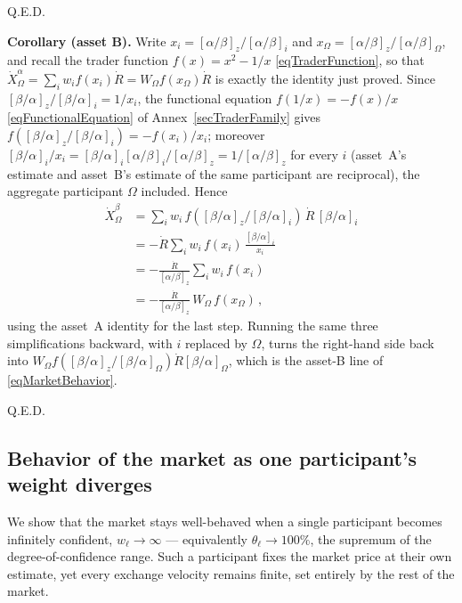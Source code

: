 \documentclass[letterpaper]{article}
\newcommand{\priceAB}{\left[\alpha / \beta\right]}
\newcommand{\priceBA}{\left[\beta / \alpha\right]}
\begin{document}
\begin{flushright}
Q.E.D.
\end{flushright}

\textbf{Corollary (asset B).} Write $x_i = \priceAB_z/\priceAB_i$ and $x_\Omega = \priceAB_z/\priceAB_\Omega$, and recall the trader function $f(x) = x^2 - 1/x$ \eqref{eqTraderFunction}, so that $\dot{X}_\Omega^\alpha = \sum_i w_i f(x_i) \dot{R} = W_\Omega f(x_\Omega) \dot{R}$ is exactly the identity just proved. Since $\priceBA_z/\priceBA_i = 1/x_i$, the functional equation $f(1/x) = -f(x)/x$ \eqref{eqFunctionalEquation} of Annex~\ref{secTraderFamily} gives $f(\priceBA_z/\priceBA_i) = -f(x_i)/x_i$; moreover $\priceBA_i/x_i = \priceBA_i \priceAB_i/\priceAB_z = 1/\priceAB_z$ for every $i$ (asset~A's estimate and asset~B's estimate of the same participant are reciprocal), the aggregate participant $\Omega$ included. Hence
\begin{align*}
    \dot{X}_\Omega^\beta &= \sum_i w_i\, f\!\left(\priceBA_z/\priceBA_i\right)\, \dot{R}\, \priceBA_i\\
    &= -\dot{R} \sum_i w_i\, f(x_i)\, \frac{\priceBA_i}{x_i}\\
    &= -\frac{\dot{R}}{\priceAB_z} \sum_i w_i\, f(x_i)\\
    &= -\frac{\dot{R}}{\priceAB_z}\, W_\Omega\, f(x_\Omega)\,,
\end{align*}
using the asset~A identity for the last step. Running the same three simplifications backward, with $i$ replaced by $\Omega$, turns the right-hand side back into $W_\Omega f(\priceBA_z/\priceBA_\Omega) \dot{R} \priceBA_\Omega$, which is the asset-B line of \eqref{eqMarketBehavior}.
\begin{flushright}
Q.E.D.
\end{flushright}

\subsection{Behavior of the market as one participant's weight diverges}\label{secProofInfiniteWeight}

We show that the market stays well-behaved when a single participant becomes infinitely confident, $w_\ell \to \infty$ --- equivalently $\theta_\ell \to 100\%$, the supremum of the degree-of-confidence range. Such a participant fixes the market price at their own estimate, yet every exchange velocity remains finite, set entirely by the rest of the market.
\end{document}
